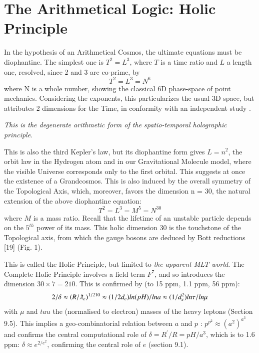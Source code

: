 \documentclass[twoside,draft]{article}
\begin{document}
\begin{sloppypar}
\section{The Arithmetical Logic: Holic Principle}

In the hypothesis of an Arithmetical Cosmos, the ultimate equations must be diophantine. The
simplest one is $T^{2} = L^{3}$, where $T$ is a time ratio and $L$ a length one, resolved, since 2 and 3 are 
co-prime, by $$T^{2} = L^{3} = N^{6}$$ where N is a whole number, showing the classical 6D phase-space of point mechanics. Considering the exponents, this particularizes the usual 3D space, but attributes 2 dimensions for the Time, in conformity with an independent study \cite{Bars}.

\textit{This is the degenerate arithmetic form of the spatio-temporal holographic principle}.

This is also the third Kepler's law, but its diophantine form gives $L = n^{2}$, the orbit law in the Hydrogen atom and in our
Gravitational Molecule model, where the visible Universe corresponds only to the first orbital. This suggests at once the existence of a Grandcosmos. This is also induced by the overall symmetry of the Topological Axis, which, moreover, favors the
dimension n = 30, the natural extension of the above diophantine equation:
\begin{equation}
T^{2} = L^{3} = M^{5} = N^{30}
\end{equation}
where $M$ is a mass ratio. Recall that the lifetime of an unstable particle depends on the $5^{th}$ power of its mass. This holic dimension 30 is the touchstone of the Topological axis, from which the gauge bosons are deduced by Bott reductions [19] (Fig. 1).

This is called the Holic Principle, but limited to \textit{the apparent MLT world}. The Complete Holic
Principle \cite{Sanchez4} involves a field term $F^{7}$, and so introduces the dimension $30 \times 7 = 210$. This is confirmed by (to 15 ppm, 1.1 ppm, 56 ppm):
$$2/\delta \approx (R/\lambdabar_{e})^{1/210} \approx (1/2d_{e}) ln(pH)/lna \approx (1/d_e^{2})ln\tau/ln\mu$$
with $\mu$ and $tau$ the (normalised to electron) masses of the heavy leptons (Section 9.5). This implies a geo-combinatorial relation between $a$ and $p$ : $p^{p^{2}} \approx (a^{2})^{a^{3}}$ and confirms the central computational role of $\delta = R^{\prime}/R = pH/a^{3}$, which is to 1.6 ppm: $\delta \approx e^{2/e^2}$, confirming the central role of $e$ (section 9.1).


\end{sloppypar}
\end{document}
